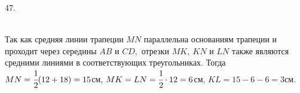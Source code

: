 47. \begin{figure}[ht!]
\end{figure}\\
Так как средняя линии трапеции $MN$ параллельна основаниям трапеции и проходит через середины $AB$ и $CD,$ отрезки $MK,\ KN$ и $LN$ также являются средними линиями в соответствующих треугольниках. Тогда $MN=\cfrac{1}{2}(12+18)=15$см, $MK=LN=\cfrac{1}{2}\cdot12=6$см, $KL=15-6-6=3$см.\\
